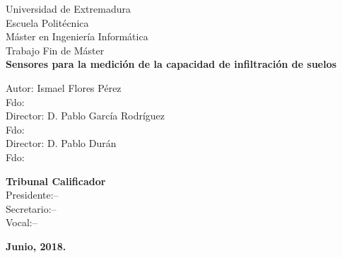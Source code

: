 \begin{center}
{\huge Universidad de Extremadura}\\[0.5cm]
{\LARGE Escuela Politécnica}\\[0.5cm]
{\Large Máster en Ingeniería Informática}\\[0.5cm]
{\Large Trabajo Fin de Máster}\\[0.3cm]
{\Large \textbf{Sensores para la medición de la capacidad de infiltración de suelos}}\\[0.5cm]
\end{center}


\begin{center}
{\normalsize Autor: Ismael Flores Pérez}\\[0.05cm]
{\normalsize Fdo:}\\[0.10cm]
{\normalsize Director: D. Pablo García Rodríguez}\\[0.05cm]
{\normalsize Fdo:}\\[0.10cm]
{\normalsize Director: D. Pablo Durán}\\[0.05cm]
{\normalsize Fdo:}\\[0.6cm]
\end{center}


\begin{flushleft}
{\normalsize \textbf{Tribunal Calificador}}\\[0.2cm]

{\normalsize Presidente:--}\\[0.2cm]
{\normalsize Secretario:--}\\[0.2cm]
{\normalsize Vocal:--}\\[0.2cm]
\end{flushleft}


\begin{center}
\vspace*{0.2cm}
\textbf{Junio, 2018.}
\end{center}


